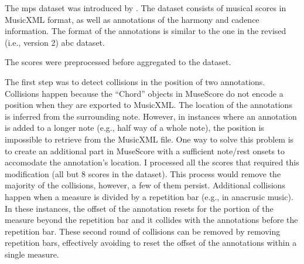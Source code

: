 

The \gls{mps} dataset was introduced by
\textcite{hentschel2021annotated}. The dataset consists of
musical scores in MusicXML format, as well as annotations of
the harmony and cadence information. The format of the
annotations is similar to the one in the revised (i.e.,
version 2) \gls{abc} dataset.


The scores were preprocessed before aggregated to the
dataset.

The first step was to detect collisions in the position of
two annotations. Collisions happen because the ``Chord''
objects in MuseScore do not encode a position when they are
exported to MusicXML. The location of the annotations is
inferred from the surrounding note. However, in instances
where an annotation is added to a longer note (e.g., half
way of a whole note), the position is impossible to retrieve
from the MusicXML file. One way to solve this problem is to
create an additional part in MuseScore with a sufficient
note/rest onsets to accomodate the annotation's location. I
processed all the scores that required this modification
(all but 8 scores in the dataset). This process would remove
the majority of the collisions, however, a few of them
persist. Additional collisions happen when a measure is
divided by a repetition bar (e.g., in anacrusic music). In
these instances, the offset of the annotation resets for the
portion of the measure beyond the repetition bar and it
collides with the annotations before the repetition bar.
These second round of collisions can be removed by removing
repetition bars, effectively avoiding to reset the offset of
the annotations within a single measure.
